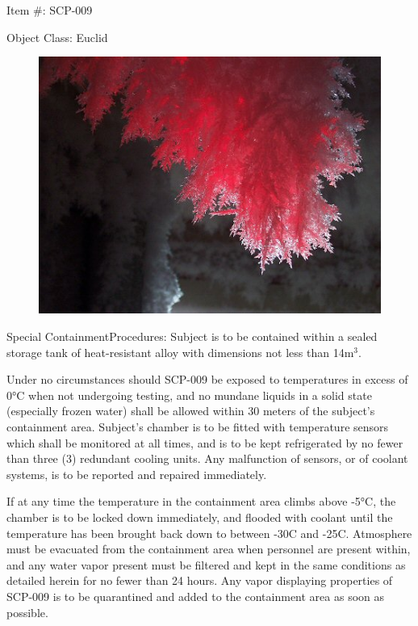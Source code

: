 Item \#: SCP-009

Object Class: Euclid

\begin{figure}
\includegraphics[scale=1.3]{scp/009.jpg}
\end{figure}
Special Containment\linebreak Procedures: Subject is to be contained within a sealed storage tank of heat-resistant alloy with dimensions not less than 14m$^3$.

Under no circumstances should SCP-009 be exposed to temperatures in excess of 0°C when not undergoing testing, and no mundane liquids in a solid state (especially frozen water) shall be allowed within 30 meters of the subject's containment area. Subject's chamber is to be fitted with temperature sensors which shall be monitored at all times, and is to be kept refrigerated by no fewer than three (3) redundant cooling units. Any malfunction of sensors, or of coolant systems, is to be reported and repaired immediately.

If at any time the temperature in the containment area climbs above -5°C, the chamber is to be locked down immediately, and flooded with coolant until the temperature has been brought back down to between -30\degree C and -25\degree C. Atmosphere must be evacuated from the containment area when personnel are present within, and any water vapor present must be filtered and kept in the same conditions as detailed herein for no fewer than 24 hours. Any vapor displaying properties of SCP-009 is to be quarantined and added to the containment area as soon as possible.

